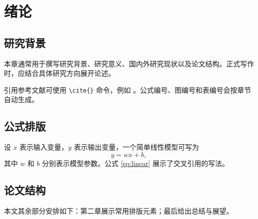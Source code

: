 \chapter{绪论}

\section{研究背景}

本章通常用于撰写研究背景、研究意义、国内外研究现状以及论文结构。正式写作时，应结合具体研究方向展开论述。

引用参考文献可使用 \verb|\cite{}| 命令，例如 \cite{lamport1994latex}。公式编号、图编号和表编号会按章节自动生成。

\section{公式排版}

设 $x$ 表示输入变量，$y$ 表示输出变量，一个简单线性模型可写为
\begin{equation}
  y = wx + b ,
  \label{eq:linear}
\end{equation}
其中 $w$ 和 $b$ 分别表示模型参数。公式 \ref{eq:linear} 展示了交叉引用的写法。

\section{论文结构}

本文其余部分安排如下：第二章展示常用排版元素；最后给出总结与展望。
